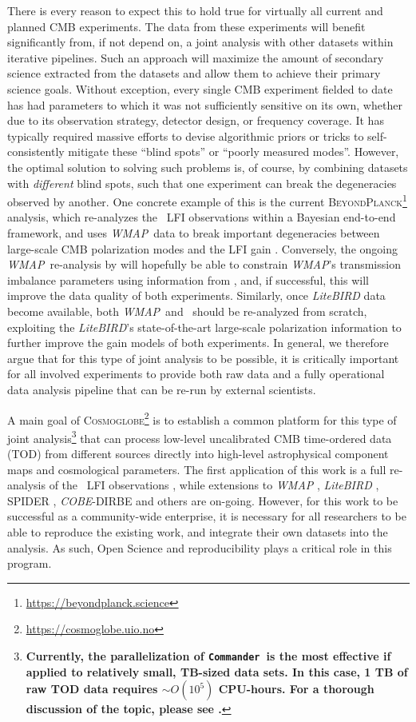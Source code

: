 \documentclass[twocolumn]{openjournal}
\def\WMAP{\textit{WMAP}}
\def\COBE{\textit{COBE}}
\def\commander{\texttt{Commander}}
\newcommand{\BP}{\textsc{BeyondPlanck}}
\newcommand{\cosmoglobe}{\textsc{Cosmoglobe}}
\begin{document}
There is every reason to expect this to hold true for virtually all current and
planned CMB experiments. The data from these experiments will benefit
significantly from, if not depend on, a joint analysis with other datasets
within iterative pipelines. Such an approach will maximize the amount of
secondary science extracted from the datasets and allow them to achieve their
primary science goals. Without exception, every single CMB experiment fielded
to date has had parameters to which it was not sufficiently sensitive on its
own, whether due to its observation strategy, detector design, or frequency
coverage. It has typically required massive efforts to devise algorithmic
priors or tricks to self-consistently mitigate these ``blind spots'' or
``poorly measured modes''. However, the optimal solution to solving such
problems is, of course, by combining datasets with \emph{different} blind
spots, such that one experiment can break the degeneracies observed by another.
One concrete example of this is the current
\BP\footnote{\url{https://beyondplanck.science}} analysis, which re-analyzes
the \Planck\ LFI observations within a Bayesian end-to-end framework, and uses
\WMAP\ data to break important degeneracies between large-scale CMB
polarization modes and the LFI gain \citep{bp01,bp07}. Conversely, the ongoing
\WMAP\ re-analysis by \citet{bp17} will hopefully be able to constrain \WMAP's
transmission imbalance parameters using information from \Planck, and, if
successful, this will improve the data quality of both experiments. Similarly,
once \textit{LiteBIRD} data become available, both \WMAP\ and \Planck\ should
be re-analyzed from scratch, exploiting the \textit{LiteBIRD}'s
state-of-the-art large-scale polarization information to further improve the
gain models of both experiments. In general, we therefore argue that for this
type of joint analysis to be possible, it is critically important for all
involved experiments to provide both raw data and a fully operational data
analysis pipeline that can be re-run by external scientists.

A main goal of \cosmoglobe\footnote{\url{https://cosmoglobe.uio.no}} is to establish a common platform for this type of joint analysis\footnote{\textbf{Currently, the parallelization of \commander\ is the most effective if applied to relatively small, TB-sized data sets. In this case, 1 TB of raw TOD data requires $\sim O(10^5)$ CPU-hours. For a thorough discussion of the topic, please see \cite{bp03}.}} that can process low-level uncalibrated CMB time-ordered data (TOD) from different sources directly into high-level astrophysical component maps and cosmological parameters. The first application of this work is a full re-analysis of the \Planck\ LFI observations \citep[][and references therein]{bp01}, while extensions to \textit{WMAP} \citep{bp17}, \textit{LiteBIRD} \citep{litebird2022}, SPIDER \citep{spider21}, \COBE-DIRBE \citep{hauser:1998} and others are on-going. However, for this work to be successful as a community-wide enterprise, it is necessary for all researchers to be able to reproduce the existing work, and integrate their own datasets into the analysis. As such, Open Science and reproducibility plays a critical role in this program.
\end{document}
